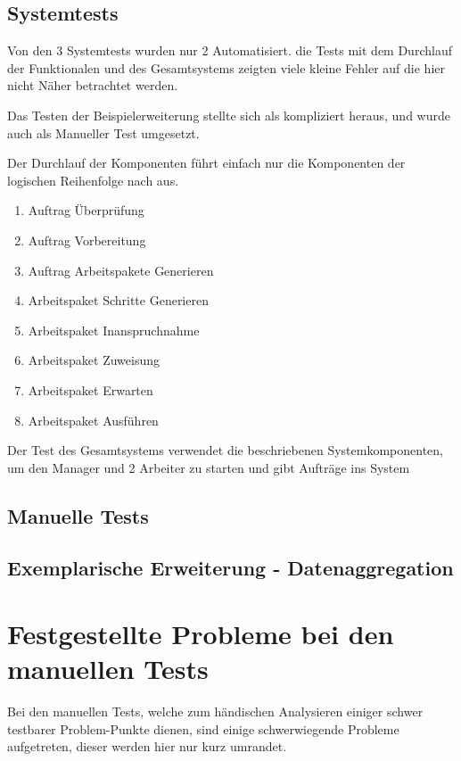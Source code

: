 \subsection{Systemtests}

Von den 3 Systemtests wurden nur 2 Automatisiert.
die Tests mit dem Durchlauf der Funktionalen  und des Gesamtsystems
zeigten viele kleine Fehler auf die hier nicht Näher betrachtet werden.

Das Testen der Beispielerweiterung stellte sich als kompliziert heraus, und wurde auch als Manueller Test umgesetzt.

Der Durchlauf der Komponenten führt einfach nur die Komponenten der logischen Reihenfolge nach aus.
\begin{enumerate}
    \item Auftrag Überprüfung
    \item Auftrag Vorbereitung
    \item Auftrag Arbeitspakete Generieren
    \item Arbeitspaket Schritte Generieren
    \item Arbeitspaket Inanspruchnahme
    \item Arbeitspaket Zuweisung
    \item Arbeitspaket Erwarten
    \item Arbeitspaket Ausführen
\end{enumerate}

Der Test des Gesamtsystems verwendet die beschriebenen Systemkomponenten, um den Manager und 2 Arbeiter zu starten und gibt Aufträge ins System

\subsection{Manuelle Tests}

\subsection{Exemplarische Erweiterung - Datenaggregation}




\section{Festgestellte Probleme bei den manuellen Tests}

Bei den manuellen Tests, welche zum händischen Analysieren
einiger schwer testbarer Problem-Punkte dienen,
sind einige schwerwiegende Probleme aufgetreten,
dieser werden hier nur kurz umrandet.

